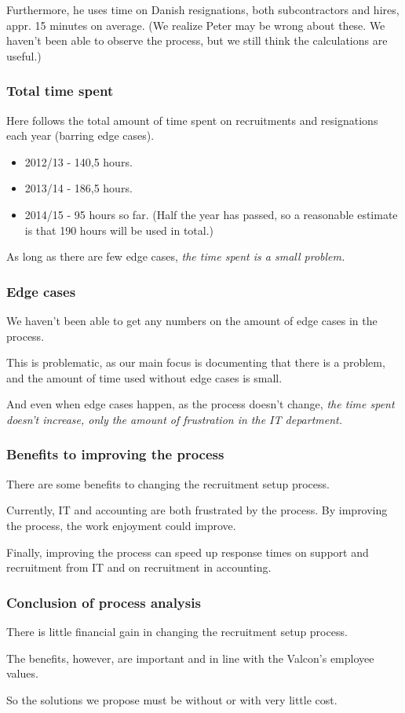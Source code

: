 Furthermore, he uses time on Danish resignations, both subcontractors and hires, appr. 15 minutes on average.
(We realize Peter may be wrong about these. We haven't been able to observe the process, but we still think the calculations are useful.)


\subsubsection{Total time spent}
Here follows the total amount of time spent on recruitments and resignations each year (barring edge cases).
\begin{itemize}
\item 2012/13 - 140,5 hours.
\item 2013/14 - 186,5 hours.
\item 2014/15 - 95 hours so far. (Half the year has passed, so a reasonable estimate is that 190 hours will be used in total.)
\end{itemize}

As long as there are few edge cases, \emph{the time spent is a small problem.}

\subsubsection{Edge cases}
We haven't been able to get any numbers on the amount of edge cases in the process.

This is problematic, as our main focus is documenting that there is a problem, and the amount of time used without edge cases is small.

And even when edge cases happen, as the process doesn't change, \emph{the time spent doesn't increase, only the amount of frustration in the IT department.}

\subsubsection{Benefits to improving the process}
There are some benefits to changing the recruitment setup process.

Currently, IT and accounting are both frustrated by the process.
By improving the process, the work enjoyment could improve.

Finally, improving the process can speed up response times on support and recruitment from IT and on recruitment in accounting.

\subsubsection{Conclusion of process analysis}
There is little financial gain in changing the recruitment setup process.

The benefits, however, are important and in line with the Valcon's employee values.

So the solutions we propose must be without or with very little cost.